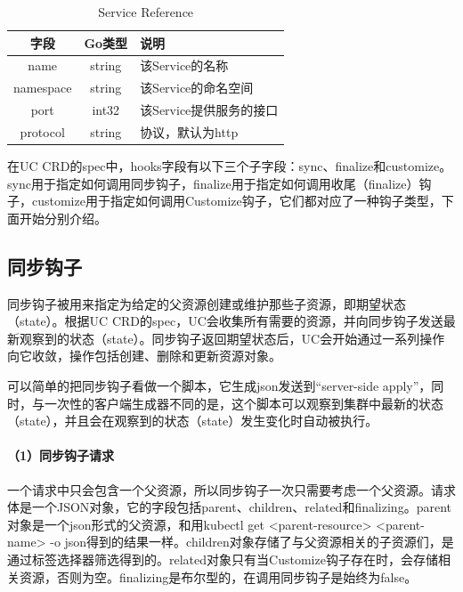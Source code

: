 \documentclass[macfonts,master]{njuthesis}
\begin{document}
\begin{table}
  \centering
  \begin{tabular}{ccp{50mm}}
    \toprule
    \textbf{字段} & \textbf{Go类型} & \textbf{说明} \\
    \midrule
    name  & string  & 该Service的名称\\
    namespace  & string   &  该Service的命名空间 \\
    port     & int32  & 该Service提供服务的接口 \\
    protocol    & string   &  协议，默认为http \\
    \bottomrule
  \end{tabular}
  \caption{Service Reference}\label{table:service-reference}
\end{table}

在UC CRD的spec中，hooks字段有以下三个子字段：sync、finalize和customize。sync用于指定如何调用同步钩子，finalize用于指定如何调用收尾（finalize）钩子，customize用于指定如何调用Customize钩子，它们都对应了一种钩子类型，下面开始分别介绍。

\subsection{同步钩子}

同步钩子被用来指定为给定的父资源创建或维护那些子资源，即期望状态（state）。根据UC CRD的spec，UC会收集所有需要的资源，并向同步钩子发送最新观察到的状态（state）。同步钩子返回期望状态后，UC会开始通过一系列操作向它收敛，操作包括创建、删除和更新资源对象。

可以简单的把同步钩子看做一个脚本，它生成json发送到``server-side apply''，同时，与一次性的客户端生成器不同的是，这个脚本可以观察到集群中最新的状态（state），并且会在观察到的状态（state）发生变化时自动被执行。

\paragraph{（1）同步钩子请求}
一个请求中只会包含一个父资源，所以同步钩子一次只需要考虑一个父资源。请求体是一个JSON对象，它的字段包括parent、children、related和finalizing。parent对象是一个json形式的父资源，和用kubectl get <parent-resource> <parent-name> -o json得到的结果一样。children对象存储了与父资源相关的子资源们，是通过标签选择器筛选得到的。related对象只有当Customize钩子存在时，会存储相关资源，否则为空。finalizing是布尔型的，在调用同步钩子是始终为false。
\end{document}
